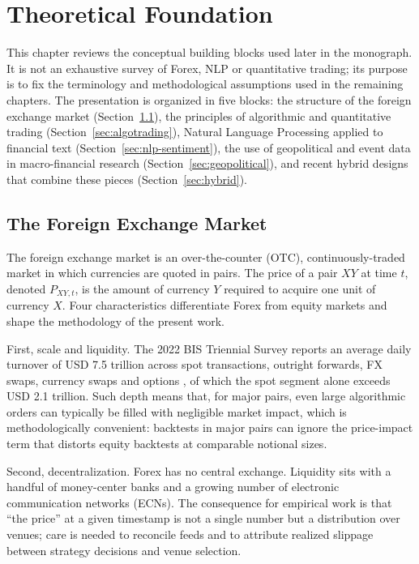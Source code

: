 \chapter{Theoretical Foundation} \label{cap:theoretical-foundation}

This chapter reviews the conceptual building blocks used later in the monograph. It is not an exhaustive survey of Forex, NLP or quantitative trading; its purpose is to fix the terminology and methodological assumptions used in the remaining chapters. The presentation is organized in five blocks: the structure of the foreign exchange market (Section~\ref{sec:fx-market}), the principles of algorithmic and quantitative trading (Section~\ref{sec:algotrading}), Natural Language Processing applied to financial text (Section~\ref{sec:nlp-sentiment}), the use of geopolitical and event data in macro-financial research (Section~\ref{sec:geopolitical}), and recent hybrid designs that combine these pieces (Section~\ref{sec:hybrid}).

\section{The Foreign Exchange Market} \label{sec:fx-market}

The foreign exchange market is an over-the-counter (OTC), continuously-traded market in which currencies are quoted in pairs. The price of a pair $XY$ at time $t$, denoted $P_{XY,t}$, is the amount of currency $Y$ required to acquire one unit of currency $X$. Four characteristics differentiate Forex from equity markets and shape the methodology of the present work.

First, scale and liquidity. The 2022 BIS Triennial Survey reports an average daily turnover of USD 7.5 trillion across spot transactions, outright forwards, FX swaps, currency swaps and options \cite{bis2022triennial}, of which the spot segment alone exceeds USD 2.1 trillion. Such depth means that, for major pairs, even large algorithmic orders can typically be filled with negligible market impact, which is methodologically convenient: backtests in major pairs can ignore the price-impact term that distorts equity backtests at comparable notional sizes.

Second, decentralization. Forex has no central exchange. Liquidity sits with a handful of money-center banks and a growing number of electronic communication networks (ECNs). The consequence for empirical work is that ``the price'' at a given timestamp is not a single number but a distribution over venues; care is needed to reconcile feeds and to attribute realized slippage between strategy decisions and venue selection.

